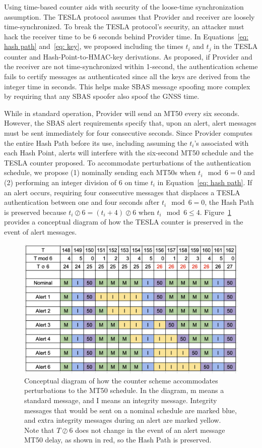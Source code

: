 \documentclass[letterpaper,times]{IONconf/IONconf}
\begin{document}
			Using time-based counter aids with security of the loose-time synchronization assumption.
			The TESLA protocol assumes that Provider and receiver are loosely time-synchronized.
			To break the TESLA protocol's security, an attacker must hack the receiver time to be 6 seconds behind Provider time.
			In Equations~\eqref{eq: hash path} and~\eqref{eq: key}, we proposed including the times $t_i$ and $t_j$ in the TESLA counter and Hash-Point-to-HMAC-key derivations.
			As proposed, if Provider and the receiver are not time-synchronized within 1-second, the authentication scheme fails to certify messages as authenticated since all the keys are derived from the integer time in seconds.
			This helps make SBAS message spoofing more complex by requiring that any SBAS spoofer also spoof the GNSS time.

			While in standard operation, Provider will send an MT50 every six seconds.
			However, the SBAS alert requirements specify that, upon an alert, alert messages must be sent immediately for four consecutive seconds.
			Since Provider computes the entire Hash Path before its use, including assuming the $t_i$'s associated with each Hash Point, alerts will interfere with the six-second MT50 schedule and the TESLA counter proposed.
			To accommodate perturbations of the authentication schedule, we propose (1) nominally sending each MT50s when $t_i \mod 6 = 0$ and (2) performing an integer division of 6 on time $t_i$ in Equation~\eqref{eq: hash path}.
			If an alert occurs, requiring four consecutive messages that displaces a TESLA authentication between one and four seconds after $t_i \mod 6 = 0$, the Hash Path is preserved because $t_i \oslash 6 = (t_i + 4) \oslash 6$ when $t_i \mod 6 \leq 4 $.
			Figure~\ref{fig: alert schedule} provides a conceptual diagram of how the TESLA counter is preserved in the event of alert messages.

			\begin{figure}
				\centering
				\includegraphics[width=0.5\linewidth]{fig/alertschedule.png}
				\caption{Conceptual diagram of how the counter scheme accommodates perturbations to the MT50 schedule. In the diagram, m means a standard message, and I means an integrity message. Integrity messages that would be sent on a nominal schedule are marked blue, and extra integrity messages during an alert are marked yellow. Note that $T \oslash 6$ does not change in the event of an alert message MT50 delay, as shown in red, so the Hash Path is preserved.}
				\label{fig: alert schedule}
			\end{figure}
\end{document}
